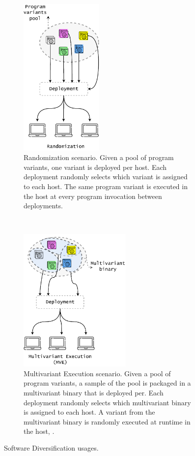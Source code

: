 \newcommand{\rulesep}{\unskip\ \vrule\ }
\begin{figure}[h]
    \centering
    \begin{subfigure}[t]{0.45\textwidth}
        \centering
        \includegraphics[height=3.1in]{diagrams/randomization.pdf}
        \vspace{0.5cm}
        \caption{Randomization scenario. Given a pool of program variants, one variant is deployed per host. Each deployment randomly selects which variant is assigned to each host. The same program variant is executed in the host at every program invocation between deployments. }        \label{diagrams:sota:randomization}

    \end{subfigure}
    \hspace{1.5mm}
    \rulesep
    \hspace{1.5mm}
    \begin{subfigure}[t]{0.45\textwidth}
        \centering
        \includegraphics[height=2.8in]{diagrams/mve.pdf}
        \caption{Multivariant Execution scenario. Given a pool of program variants, a sample of the pool is packaged in a multivariant binary that is deployed per. Each deployment randomly selects which multivariant binary is assigned to each host. A variant from the multivariant binary is randomly executed at runtime in the host, .}        \label{diagrams:sota:mve}

    \end{subfigure}
    \caption{Software Diversification usages. }
\end{figure}

